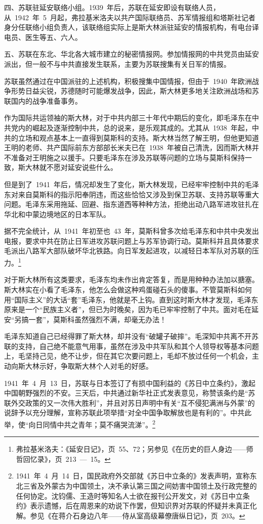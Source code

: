 四、苏联驻延安联络小组。1939~年后，苏联在延安即设有联络人员，从~1942~年~5~月起，弗拉基米洛夫以共产国际联络员、苏军情报组和塔斯社记者身分任联络小组负责人，该联络组实际上是斯大林派驻延安的情报机构，有电台译电员、医生等五、六人。

五、苏联在东北、华北各大城市建立的秘密情报网。参加情报网的中共党员由延安派出，但一般不与中共直接发生联系，主要为苏联搜集有关日军的情报。

苏联虽然通过在中国派驻的上述机构，积极搜集中国情报，但由于~1940~年欧洲战争形势日益尖锐，苏德随时可能爆发战争，因此，斯大林更多地关注欧洲战场和苏联国内的战争准备事务。

作为国际共运领袖的斯大林，对于中共内部三十年代中期后的变化，即毛泽东在中共党内的崛起及逐渐控制中共，总的说来，是乐观其成的。尤其从~1938~年起，中共的立场和观点基本上一直得到莫斯科的支持。斯大林当然了解王明，但他更知道王明的老师、共产国际前东方部部长米夫已在~1938~年被自己清洗，因而斯大林并不准备对王明施之以援手。只要毛泽东在涉及苏联等问题的立场与莫斯科保持一致，斯大林就不愿对延安说些什么。

但是到了~1941~年后，情况却发生了变化，斯大林发现，已经牢牢控制中共的毛泽东对来自莫斯科的指示阳奉阴违，而这些恰恰又涉及到保卫苏联、支持苏联等重大问题。毛泽东采用拖延、回避、指东道西等种种方法，拒绝出动八路军进攻驻扎在华北和中蒙边境地区的日本军队。

据不完全统计，从~1941~年初至也~43~年，莫斯科曾多次给毛泽东和中共中央发出电报，要求中共在防止日军进攻苏联问题上与苏军协调行动。莫斯科并且具体要求毛派出八路军大部队破坏华北铁路。向日军发起进攻，以减轻日本军队对苏联的压力。\footnote{弗拉基米洛夫：《延安日记》，页~55、72；另参见《在历史的巨人身边——师哲回忆录》，页~213~—~15。}

对于斯大林所有这类要求，毛泽东均未作出肯定答复，而是用种种办法加以搪塞。斯大林实在小看了毛泽东，他怎么会做这种鸡蛋碰石头的傻事。不管莫斯科如何用“国际主义”的大话“套”毛泽东，他就是不上钩。直到这时斯大林才发现，毛泽东原来是一个“民族主义者”，但已为时晚矣，因为毛已牢牢控制了中共。面对毛在延安“另搞一套”，莫斯科虽然强烈不满，却毫无办法！

毛泽东知道自己已经得罪了斯大林，却并没有“破罐子破摔”。毛深知中共离不开苏联的支持，自己绝不能意气用事，虽然在涉及中共军队和其个人领导权等基本问题上，毛坚持己见，绝不让步，但在其它次要问题上，毛却不放过任何一个机会，主动向斯大林示好，争取斯大林个人对毛的好感。

1941~年~4~月~13~日，苏联与日本签订了有损中国利益的《苏日中立条约》，激起中国朝野强烈的不安。三天后，中共通过新华社正式发表意见，称赞该条约是“苏联外交政策的又一次伟大胜利”，并且对苏日声明中有关“互不侵犯满洲与外蒙”的说辞予以充分理解，宣称苏联此项举措“对全中国争取解放也是有利的”。中共此举，使“向日同情中共之青年；莫不痛哭流涕”。\footnote{1941~年~4~月~14~日，国民政府外交部就《苏日中立条的》发表声明，宣称东北三省及外蒙古为中国领土，决不承认第三国之间妨害中国领土及行政完整的任何协定。沈钧儒、王造时等知名人士欲在报刊公开发文，对《苏日中立条约》表示遗憾，后在周恩来的劝说下作罢，但知识界对苏联的怀疑并未真正化解。参见《在蒋介石身边八年——侍从室高级幕僚唐纵日记》，页~203。}

